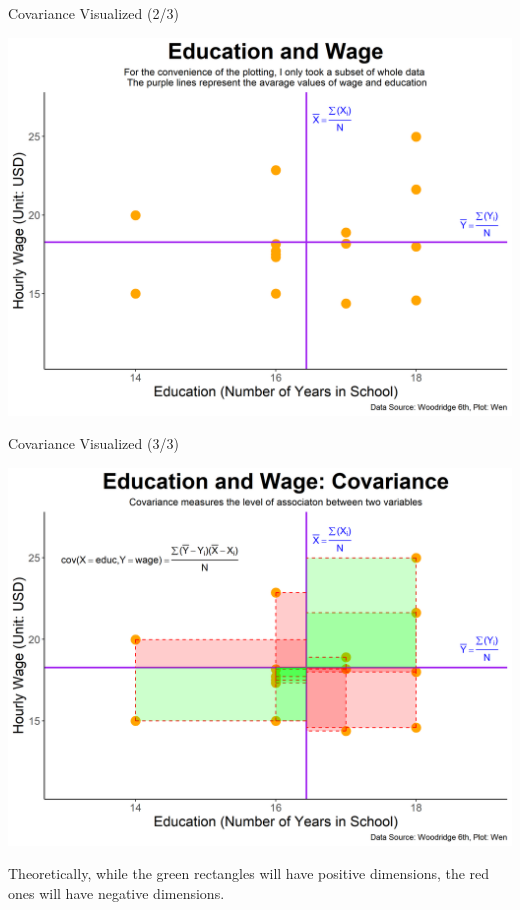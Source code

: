 \documentclass{beamer}
\begin{document}
\begin{frame}{Covariance Visualized (2/3)}
\vspace{0.2 cm}
\begin{center}
\includegraphics[scale=0.5]{images/plot1.png}
\end{center}

\end{frame}


\begin{frame}{Covariance Visualized (3/3)}
\vspace{0.2 cm}

\begin{center}
\includegraphics[scale=0.38]{images/plot2.png}
\end{center}

Theoretically, while the green rectangles will have positive dimensions, the red ones will have negative dimensions.

\end{frame}
\end{document}
